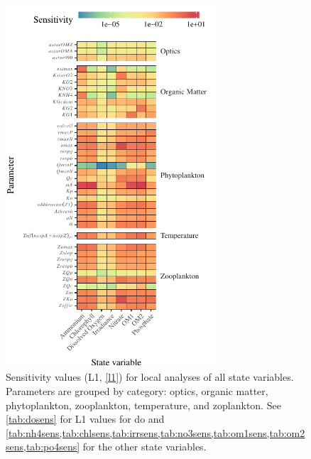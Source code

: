 \documentclass[letterpaper,12pt,oneside]{article}\usepackage[]{graphicx}\usepackage[]{color}
\begin{document}
\begin{figure}[!ht]

{\centering \includegraphics[width=0.7\textwidth]{figs/sensalltile-1} 

}

\caption{Sensitivity values (L1, \cref{l1}) for local analyses of all state variables. Parameters are grouped by category: optics, organic matter, phytoplankton, zooplankton, temperature, and zoplankton.  See \cref{tab:dosens} for L1 values for \ac{do} and \cref{tab:nh4sens,tab:chlsens,tab:irrsens,tab:no3sens,tab:om1sens,tab:om2sens,tab:po4sens} for the other state variables.}\label{fig:sensalltile}
\end{figure}
\end{document}
